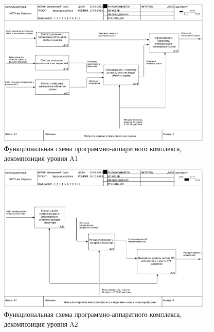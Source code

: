\begin{figure}[H]
	\centering
	\includegraphics[height=0.45\textheight]{inc/img/03_A1.pdf}
	\caption{Функциональная схема программно-аппаратного комплекса, декомпозиция уровня A1}
	\label{fig:a1}
\end{figure}

\begin{figure}[H]
	\centering
	\includegraphics[height=0.45\textheight]{inc/img/04_A2.pdf}
	\caption{Функциональная схема программно-аппаратного комплекса, декомпозиция уровня A2}
	\label{fig:a2}
\end{figure}

